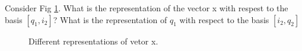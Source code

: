 \item [3.1] Consider Fig \ref{fig: basis}.
What is the representation of the vector x  with respest to the basis $[q_1, i_2]$?
What is the representation of $q_1$ with respect to the basis $[i_2, q_2]$

\begin{figure}
 \caption{Different representations of vetor x.}
 \label{fig: basis}
\end{figure}
